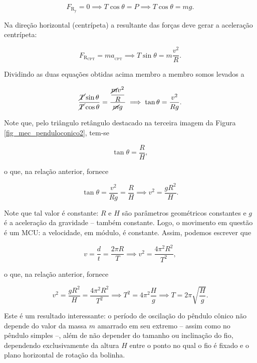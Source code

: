 \begin{exemplo}
$$ F_{\text{R}_{\text{y}}} = 0 \implies T \cos \theta = P \implies \boxed{T \cos \theta =  mg.} $$

Na direção horizontal (centrípeta) a resultante das forças deve gerar a aceleração centrípeta:

$$ F_{\text{R}_\text{CPT}} = m a_{\text{}_\text{CPT}} \implies \boxed{T \sin \theta = m \dfrac{v^2}{R}.}$$

Dividindo as duas equações obtidas acima membro a membro somos levados a

$$ \dfrac{\cancel T \sin \theta}{\cancel T \cos \theta} = \dfrac{\dfrac{\cancel mv^2}{R}}{\cancel mg} \implies \tan \theta = \dfrac{v^2}{Rg}. $$

Note que, pelo triângulo retângulo destacado na terceira imagem da Figura \ref{fig_mec_penduloconico2}, tem-se

$$ \tan \theta = \dfrac{R}{H},$$

\noindent o que, na relação anterior, fornece

$$ \tan \theta = \dfrac{v^2}{Rg} = \dfrac{R}{H} \implies v^2 = \dfrac{gR^2}{H}.$$

Note que tal valor é constante: $R$ e $H$ são parâmetros geométricos constantes e $g$ é a aceleração da gravidade -- também constante. Logo, o movimento em questão é um MCU: a velocidade, em módulo, é constante. Assim, podemos escrever que

$$ v = \dfrac{d}{t} = \dfrac{2 \pi R}{T} \implies v^2 = \dfrac{4 \pi^2 R^2}{T^2},$$

\noindent o que, na relação anterior, fornece

$$ v^2 = \dfrac{gR^2}{H} =  \dfrac{4 \pi^2 R^2}{T^2}\implies T^2 = 4 \pi^2 \dfrac{H}{g} \implies \boxed{T = 2 \pi \sqrt{ \dfrac{H}{g}}.} $$

Este é um resultado interessante: o período de oscilação do pêndulo cônico não depende do valor da massa $m$ amarrado em seu extremo -- assim como no pêndulo simples --, além de não depender do tamanho ou inclinação do fio, dependendo exclusivamente da altura $H$ entre o ponto no qual o fio é fixado e o plano horizontal de rotação da bolinha.


\end{exemplo}

\vspace{0.3cm}



